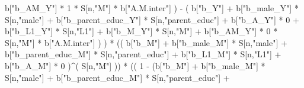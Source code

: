 \documentclass[
]{book}
\newenvironment{Shaded}{\begin{snugshade}}{\end{snugshade}}
\newcommand{\DecValTok}[1]{\textcolor[rgb]{0.00,0.00,0.81}{#1}}
\newcommand{\NormalTok}[1]{#1}
\newcommand{\SpecialCharTok}[1]{\textcolor[rgb]{0.00,0.00,0.00}{#1}}
\newcommand{\StringTok}[1]{\textcolor[rgb]{0.31,0.60,0.02}{#1}}
\begin{document}
\begin{Shaded}
\begin{Highlighting}[]
\NormalTok{                             b[}\StringTok{"b\_AM\_Y"}\NormalTok{] }\SpecialCharTok{*} \DecValTok{1} \SpecialCharTok{*}\NormalTok{ S[n,}\StringTok{"M"}\NormalTok{] }\SpecialCharTok{*}\NormalTok{ b[}\StringTok{"A.M.inter"}\NormalTok{] ) }\SpecialCharTok{{-}} 
\NormalTok{                           ( b[}\StringTok{"b\_Y"}\NormalTok{] }\SpecialCharTok{+} 
\NormalTok{                               b[}\StringTok{"b\_male\_Y"}\NormalTok{] }\SpecialCharTok{*}\NormalTok{ S[n,}\StringTok{"male"}\NormalTok{] }\SpecialCharTok{+} 
\NormalTok{                               b[}\StringTok{"b\_parent\_educ\_Y"}\NormalTok{] }\SpecialCharTok{*}\NormalTok{ S[n,}\StringTok{"parent\_educ"}\NormalTok{] }\SpecialCharTok{+} 
\NormalTok{                               b[}\StringTok{"b\_A\_Y"}\NormalTok{] }\SpecialCharTok{*} \DecValTok{0} \SpecialCharTok{+} 
\NormalTok{                               b[}\StringTok{"b\_L1\_Y"}\NormalTok{] }\SpecialCharTok{*}\NormalTok{ S[n,}\StringTok{"L1"}\NormalTok{] }\SpecialCharTok{+}
\NormalTok{                               b[}\StringTok{"b\_M\_Y"}\NormalTok{] }\SpecialCharTok{*}\NormalTok{ S[n,}\StringTok{"M"}\NormalTok{] }\SpecialCharTok{+} 
\NormalTok{                               b[}\StringTok{"b\_AM\_Y"}\NormalTok{] }\SpecialCharTok{*} \DecValTok{0} \SpecialCharTok{*}\NormalTok{ S[n,}\StringTok{"M"}\NormalTok{] }\SpecialCharTok{*}\NormalTok{ b[}\StringTok{"A.M.inter"}\NormalTok{] ) ) }\SpecialCharTok{*}
\NormalTok{      (( b[}\StringTok{"b\_M"}\NormalTok{] }\SpecialCharTok{+} 
\NormalTok{           b[}\StringTok{"b\_male\_M"}\NormalTok{] }\SpecialCharTok{*}\NormalTok{ S[n,}\StringTok{"male"}\NormalTok{] }\SpecialCharTok{+} 
\NormalTok{           b[}\StringTok{"b\_parent\_educ\_M"}\NormalTok{] }\SpecialCharTok{*}\NormalTok{ S[n,}\StringTok{"parent\_educ"}\NormalTok{] }\SpecialCharTok{+} 
\NormalTok{           b[}\StringTok{"b\_L1\_M"}\NormalTok{] }\SpecialCharTok{*}\NormalTok{ S[n,}\StringTok{"L1"}\NormalTok{] }\SpecialCharTok{+}
\NormalTok{           b[}\StringTok{"b\_A\_M"}\NormalTok{] }\SpecialCharTok{*} \DecValTok{0}\NormalTok{ )}\SpecialCharTok{\^{}}\NormalTok{( S[n,}\StringTok{"M"}\NormalTok{] )) }\SpecialCharTok{*} 
\NormalTok{      (( }\DecValTok{1} \SpecialCharTok{{-}}\NormalTok{ (b[}\StringTok{"b\_M"}\NormalTok{] }\SpecialCharTok{+} 
\NormalTok{                b[}\StringTok{"b\_male\_M"}\NormalTok{] }\SpecialCharTok{*}\NormalTok{ S[n,}\StringTok{"male"}\NormalTok{] }\SpecialCharTok{+} 
\NormalTok{                b[}\StringTok{"b\_parent\_educ\_M"}\NormalTok{] }\SpecialCharTok{*}\NormalTok{ S[n,}\StringTok{"parent\_educ"}\NormalTok{] }\SpecialCharTok{+} 

\end{Highlighting}
\end{Shaded}
\end{document}
